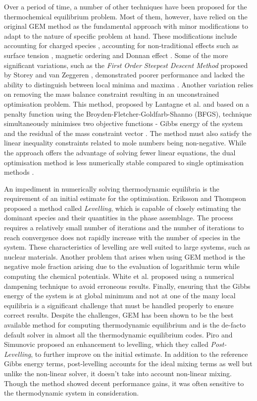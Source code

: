 	Over a period of time, a number of other techniques have been proposed for the thermochemical equilibrium problem. Most of them, however, have relied on the original GEM method \cite{White:58} as the fundamental approach with minor modifications to adapt to the nature of specific problem at hand. These modifications include accounting for charged species \cite{ERIKSSON1979375}, accounting for non-traditional effects such as surface tension \cite{KOUKKARI200618}, magnetic ordering \cite{Eriksson90} and Donnan effect \cite{PAJARRE200658}. Some of the more significant variations, such as the \emph{First Order Steepest Descent Method} proposed by Storey and van Zeggeren \cite{Storey:1964aa}, demonstrated poorer performance and lacked the ability to distinguish between local minima and maxima \cite{Storey:1964aa,vanZeggeren11}. Another variation relies on removing the mass balance constraint resulting in an unconstrained optimisation problem. This method, proposed by Lantagne et al. and based on a penalty function using the Broyden-Fletcher-Goldfarb-Shanno (BFGS), technique simultaneously minimises two objective functions - Gibbs energy of the system and the residual of the mass constraint vector \cite{LANTAGNE1988589,Nocedal06}. The method must also satisfy the linear inequality constraints related to mole numbers being non-negative. While the approach offers the advantage of solving fewer linear equations, the dual optimisation method is less numerically stable compared to single optimisation methods \cite{Nocedal06}.

	An impediment in numerically solving thermodynamic equilibria is the requirement of an initial estimate for the optimisation. Eriksson and Thompson \cite{Eriksson89} proposed a method called \emph{Levelling}, which is capable of closely estimating the dominant species and their quantities in the phase assemblage. The process requires a relatively small number of iterations and the number of iterations to reach convergence does not rapidly increase with the number of species in the system. These characteristics of levelling are well suited to large systems, such as nuclear materials. Another problem that arises when using GEM method is the negative mole fraction arising due to the evaluation of logarithmic term while computing the chemical potentials. White et al. proposed using a numerical dampening technique to avoid erroneous results. Finally, ensuring that the Gibbs energy of the system is at global minimum and not at one of the many local equilibria is a significant challenge that must be handled properly to ensure correct results. Despite the challenges, GEM has been shown to be the best available method for computing thermodynamic equilibrium and is the de-facto default solver in almost all the thermodynamic equilibrium codes. Piro and Simunovic \cite{Piro12a} proposed an enhancement to levelling, which they called \emph{Post-Levelling}, to further improve on the initial estimate. In addition to the reference Gibbs energy terms, post-levelling accounts for the ideal mixing terms as well but unlike the non-linear solver, it doesn't take into account non-linear mixing. Though the method showed decent performance gains, it was often sensitive to the thermodynamic system in consideration.

